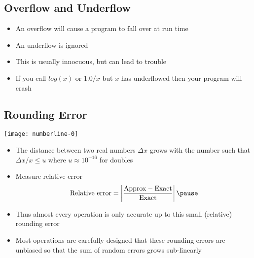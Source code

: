 
\begin{slide}
\section{Overflow and Underflow}

\begin{PauseHighLight}
  \begin{itemize}
  \item An overflow will cause a program to fall over at run time\pause
  \item An underflow is ignored\pause
  \item This is usually innocuous, but can lead to trouble\pause
  \item If you call \jl$log(x)$ or \jl$1.0/x$ but \jl$x$ has underflowed
    then your program will crash\pause
  \end{itemize}
\end{PauseHighLight}

\end{slide}


\begin{slide}
\section[-2]{Rounding Error}

\begin{PauseHighLight}
  \begin{center}
    \texttt{[image: numberline-0]}
  \end{center}
  \vspace*{-3cm}
  \begin{itemize}
  \item The distance between two real numbers $\Delta x$ grows with the
    number such that $\Delta x/x \leq u$ where $u\approx 10^{-16}$ for
    doubles\pause
  \item Measure relative error
    \begin{align*}
      \text{Relative error} = \left\vert \frac{\text{Approx} -
          \text{Exact}}{\text{Exact}} \right \vert\pause
    \end{align*}
  \item Thus almost every operation is only accurate up to this small
    (relative) rounding error\pause
  \item Most operations are carefully designed that these rounding errors are
    unbiased so that the sum of random errors grows sub-linearly\pause
  \end{itemize}
\end{PauseHighLight}

\end{slide}

